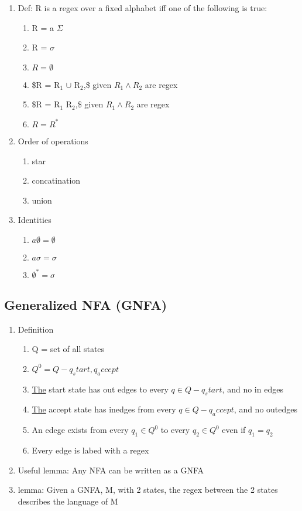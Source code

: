 \documentclass[11pt]{article}
\begin{document}
\begin{enumerate}
\item Def: R is a regex over a fixed alphabet iff one of the
      following is true:

\begin{enumerate}
\item R = a \in $\Sigma$
\item R = $\sigma$
\item $R = \emptyset$
\item \$R = R$_1$ $\cup$ R$_2$,\$ given $R_1 \wedge R_2$ are regex
\item \$R = R$_1$ R$_2$,\$ given $R_1 \wedge R_2$ are regex
\item $R = R^*$
\end{enumerate}

\item Order of operations

\begin{enumerate}
\item star
\item concatination
\item union
\end{enumerate}

\item Identities

\begin{enumerate}
\item $a \emptyset = \emptyset$
\item $a \sigma = \sigma$
\item $\emptyset^* = {\sigma}$
\end{enumerate}

\end{enumerate}
\subsection{Generalized NFA (GNFA)}
\label{sec-2.4}

\begin{enumerate}
\item Definition

\begin{enumerate}
\item Q = set of all states
\item $Q^0 = Q - {q_start, q_accept}$
\item \underline{The} start state has out edges to every $q\in Q - {q_start}$, and
         no in edges
\item \underline{The} accept state has inedges from every $q\in Q - {q_accept}$,
         and no outedges
\item An edege exists from every $q_1\in Q^0$ to every $q_2\in Q^0$
         even if $q_1=q_2$
\item Every edge is labed with a regex
\end{enumerate}

\item Useful lemma: Any NFA can be written as a GNFA
\item lemma: Given a GNFA, M,  with 2 states, the regex between the 2
      states describes the language of M
\end{enumerate}
\end{document}
